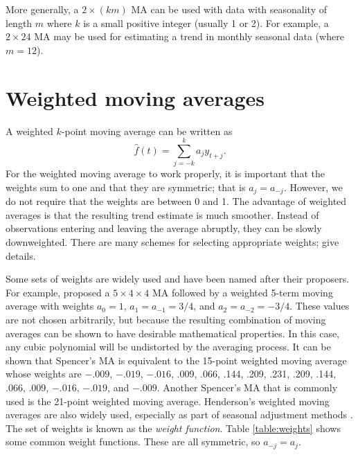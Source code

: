 \documentclass[a4paper,10pt]{article}
\begin{document}
More generally, a $2\times(km)$ MA can be used with data with seasonality of length $m$ where $k$ is a small positive integer (usually 1 or 2). For example, a $2\times24$ MA may be used for estimating a trend in monthly seasonal data (where $m=12$).

\section{Weighted moving averages}

A weighted $k$-point moving average can be written as
\[
	\hat{f}(t) = \sum^{k}_{j=-k} a_jy_{t+j}.
\]
For the weighted moving average to work properly, it is important that the weights sum to one and that they are symmetric; that is $a_j = a_{-j}$. However, we do not require that the weights are between 0 and 1. The advantage of weighted averages is that the resulting trend estimate is much smoother. Instead of observations entering and leaving the average abruptly, they can be slowly downweighted. There are many schemes for selecting appropriate weights; \citet[Chapter 46]{KSO83} give details.

Some sets of weights are widely used and have been named after their proposers.
For example, \citet{Spencer04} proposed a $5\times4\times4$ MA followed by a weighted 5-term moving average with weights $a_0=1$, $a_1=a_{-1}=3/4$, and $a_2=a_{-2}=-3/4$. These values are not chosen arbitrarily, but because the resulting combination of moving averages can be shown to have desirable mathematical properties. In this case, any cubic polynomial will be undistorted by the averaging process. It can be shown that Spencer's MA is equivalent to the 15-point weighted moving average whose weights are $-.009$, $-.019$, $-.016$, .009, .066, .144, .209, .231, .209, .144, .066, .009, $-.016$, $-.019$, and $-.009$. Another Spencer's MA that is commonly used is the 21-point weighted moving average. Henderson's weighted moving averages are also widely used, especially as part of seasonal adjustment methods \citep{Dagum2016}. The set of weights is known as the \emph{weight function}. Table \ref{table:weights} shows some common weight functions. These are all symmetric, so $a_{-j} = a_j$.
\end{document}
